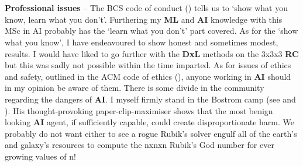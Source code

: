\\
\\
\textbf{Professional issues} -- The BCS code of conduct (\cite{BCS}) tells us to `show what you know, learn what you don't'. Furthering my \textbf{ML} and \textbf{AI} knowledge with this MSc in AI probably has the `learn what you don't' part covered. As for the `show what you know', I have endeavoured to show honest and sometimes modest, results. I would have liked to go further with the \textbf{DxL} methods on the 3x3x3 \textbf{RC} but this was sadly not possible within the time imparted. As for issues of ethics and safety, outlined in the ACM code of ethics (\cite{ACM}), anyone working in \textbf{AI} should in my opinion be aware of them. There is some divide in the community regarding the dangers of \textbf{AI}. I myself firmly stand in the Bostrom camp (see \cite{https://doi.org/10.1111/1758-5899.12718} and \cite{Bostrom2014}). His thought-provoking paper-clip-maximiser shows that the most benign looking \textbf{AI} agent, if sufficiently capable, could create disproportionate harm. We probably do not want either to see a rogue Rubik's solver engulf all of the earth's and galaxy's resources to compute the nxnxn Rubik's God number for ever growing values of n!
